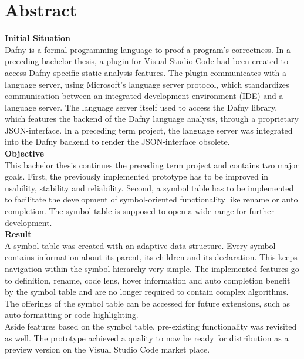 \section{Abstract}
\label{section:abstract}

\textbf{Initial Situation}\\
Dafny is a formal programming language to proof a program's correctness.
In a preceding bachelor thesis, a plugin for Visual Studio Code had been created to access Dafny-specific static analysis features.
The plugin communicates with a language server, using Microsoft's language server protocol, which standardizes communication between an integrated development environment (IDE) and a language server.
The language server itself used to access the Dafny library, which features the backend of the Dafny language analysis, through a proprietary JSON-interface.
In a preceding term project, the language server was integrated into the Dafny backend to render the JSON-interface obsolete.\\

\textbf{Objective}\\
This bachelor thesis continues the preceding term project and contains two major goals.
First, the previously implemented prototype has to be improved in usability, stability and reliability.
Second, a symbol table has to be implemented to facilitate the development
of symbol-oriented functionality like rename or auto completion.
The symbol table is supposed to open a wide range for further development.\\

\textbf{Result}\\
A symbol table was created with an adaptive data structure.
Every symbol contains information about its parent, its children and its declaration.
This keeps navigation within the symbol hierarchy very simple.
The implemented features go to definition, rename, code lens, hover information and auto completion benefit by the symbol table and are no longer required to contain complex algorithms.
The offerings of the symbol table can be accessed for future extensions, such as auto formatting or code highlighting.\\

Aside features based on the symbol table, pre-existing functionality was revisited as well.
The prototype achieved a quality to now be ready for distribution as a preview version on the Visual Studio Code market place.
